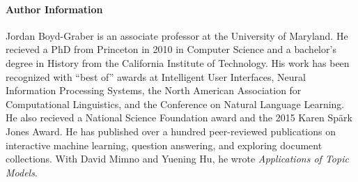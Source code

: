 \begin{comment}
        \begin{enumerate*}
        \item {\bf Science Fiction Question Answering}: Science fiction is the
        standard mode of predicting how humans and computers will interact in
        the future.  From Hal's questions in \textit{2001} to the Voigt-Kampff
        test in \textit{Blade Runner}, this chapter reflects on how plausible
        and what warnings science fiction offers for question answering.

        \item {\bf Human--Computer Centaurs}: This chapter looks at
        another \abr{ai} victory---chess---and how computers evolved into
        collaborators of humans rather than competitors.  How should computers
        and humans work together to answer hard questions?  The answer (and
        how we build \abr{ai} systems) will determine the future of the
        economy.

        \item {\bf Computer Game Shows of the Future}: Finally, we bring
        together two of the themes of the book: computers answering questions
        and game shows.  How could we use the gimick of the game show format
        to shape \abr{ai} into what would best serve society and help inform the
        public about the true state of \abr{ai} research?

        \end{enumerate*}

\end{enumerate}
\end{comment}


\paragraph{Author Information}

Jordan Boyd-Graber is an associate professor at the University of Maryland.
He recieved a PhD from Princeton in 2010 in Computer Science and a bachelor's
degree in History from the California Institute of Technology.
%
His work has been recognized with ``best of'' awards at Intelligent User
Interfaces, Neural Information Processing Systems, the North American
Association for Computational Linguistics, and the Conference on Natural
Language Learning.
%
He also recieved a National Science Foundation  award and the 2015
Karen Sp\"ark Jones Award.
%
He has published over a hundred peer-reviewed publications on interactive
machine learning, question answering, and exploring document collections.
%
With David Mimno and Yuening Hu, he wrote \emph{Applications of Topic Models}.

